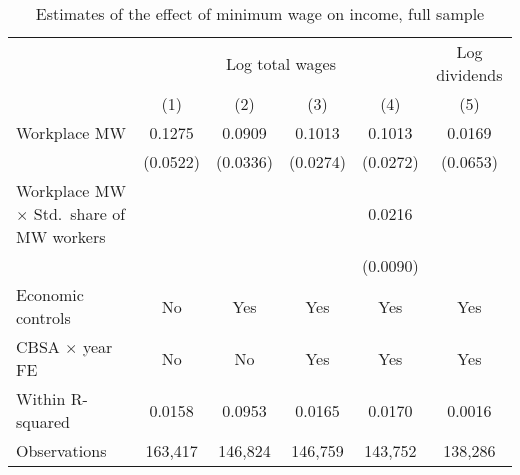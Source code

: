 \begin{table}[hbt!]
    \centering
    \caption{Estimates of the effect of minimum wage on income, full sample}
    \label{tab:static_wages}

    \begin{tabular}{@{}lccccc@{}}
        \toprule
                                & \multicolumn{4}{c}{Log total wages}
                                & \multicolumn{1}{c}{Log dividends}                        \\ \cmidrule(lr){2-5}\cmidrule(lr){6-6}
                                & (1)       & (2)      & (3)      & (4)       & (5)        \\ \midrule
        Workplace MW            & 0.1275       & 0.0909      & 0.1013      & 0.1013       & 0.0169        \\
                                & (0.0522)     & (0.0336)    & (0.0274)    & (0.0272)     & (0.0653)      \\
        Workplace MW $\times$ Std.\ 
            share of MW workers &           &          &          & 0.0216       &            \\
                                &           &          &          & (0.0090)     &            \\ \midrule
        Economic controls       & No        & Yes      & Yes      & Yes       & Yes        \\
        CBSA $\times$ year FE   & No        & No       & Yes      & Yes       & Yes        \\
        Within R-squared        & 0.0158       & 0.0953      & 0.0165      & 0.0170       & 0.0016        \\
        Observations            & 163,417      & 146,824     & 146,759     & 143,752      & 138,286       \\ \bottomrule
    \end{tabular}


\end{table}
